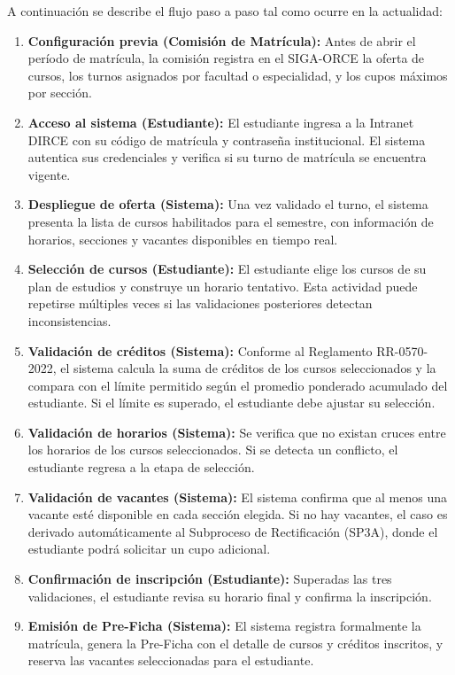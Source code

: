 A continuaci\'on se describe el flujo paso a paso tal como ocurre en la actualidad:

\begin{enumerate}
    \item \textbf{Configuraci\'on previa (Comisi\'on de Matr\'icula):} Antes de abrir el
    per\'iodo de matr\'icula, la comisi\'on registra en el SIGA-ORCE la oferta de cursos, los
    turnos asignados por facultad o especialidad, y los cupos m\'aximos por secci\'on.

    \item \textbf{Acceso al sistema (Estudiante):} El estudiante ingresa a la Intranet
    DIRCE con su c\'odigo de matr\'icula y contrase\~na institucional. El sistema autentica sus
    credenciales y verifica si su turno de matr\'icula se encuentra vigente.

    \item \textbf{Despliegue de oferta (Sistema):} Una vez validado el turno, el sistema
    presenta la lista de cursos habilitados para el semestre, con informaci\'on de horarios,
    secciones y vacantes disponibles en tiempo real.

    \item \textbf{Selecci\'on de cursos (Estudiante):} El estudiante elige los cursos de
    su plan de estudios y construye un horario tentativo. Esta actividad puede repetirse
    m\'ultiples veces si las validaciones posteriores detectan inconsistencias.

    \item \textbf{Validaci\'on de cr\'editos (Sistema):} Conforme al Reglamento RR-0570-2022, el sistema calcula la suma de cr\'editos de los cursos seleccionados y la compara con el l\'imite permitido seg\'un el promedio ponderado acumulado del estudiante.
    Si el l\'imite es superado, el estudiante debe ajustar su selecci\'on.

    \item \textbf{Validaci\'on de horarios (Sistema):} Se verifica que no existan cruces
    entre los horarios de los cursos seleccionados. Si se detecta un conflicto, el
    estudiante regresa a la etapa de selecci\'on.

    \item \textbf{Validaci\'on de vacantes (Sistema):} El sistema confirma que al menos
    una vacante est\'e disponible en cada secci\'on elegida. Si no hay vacantes, el caso es
    derivado autom\'aticamente al Subproceso de Rectificaci\'on (SP3A), donde el estudiante
    podr\'a solicitar un cupo adicional.

    \item \textbf{Confirmaci\'on de inscripci\'on (Estudiante):} Superadas las tres
    validaciones, el estudiante revisa su horario final y confirma la inscripci\'on.

    \item \textbf{Emisi\'on de Pre-Ficha (Sistema):} El sistema registra formalmente la
    matr\'icula, genera la Pre-Ficha con el detalle de cursos y cr\'editos inscritos, y
    reserva las vacantes seleccionadas para el estudiante.
\end{enumerate}

